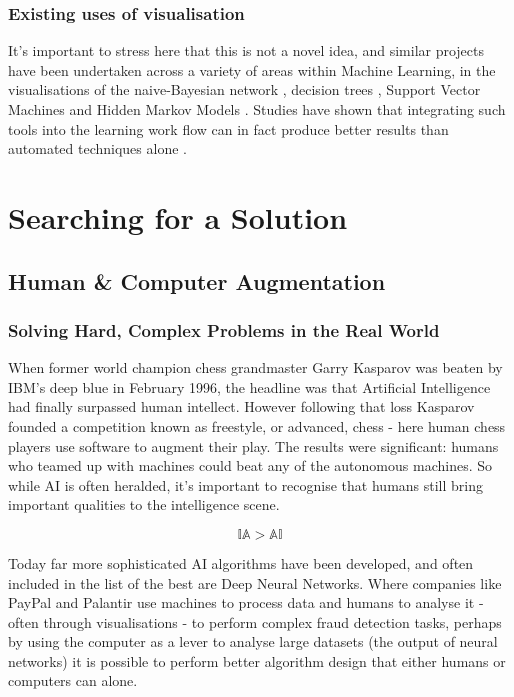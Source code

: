 \documentclass[a4paper,11pt,titlepage]{article}
\begin{document}
\subsubsection{Existing uses of visualisation}
	It's important to stress here that this is not a novel idea, and similar projects have been undertaken across a variety of areas within Machine Learning, in the visualisations of the naive-Bayesian network \cite{Becker2001}, decision trees \cite{Ankerst1999}, Support Vector Machines \cite{Caragea2001} and Hidden Markov Models \cite{Dai2008}. Studies have shown that integrating such tools into the learning work flow can in fact produce better results than automated techniques alone \cite{Ware2002}.

\clearpage 

\section{Searching for a Solution}
	\subsection{Human \& Computer Augmentation}

\subsubsection{Solving Hard, Complex Problems in the Real World}

	When former world champion chess grandmaster Garry Kasparov was beaten by IBM’s deep blue in February 1996, the headline was that Artificial Intelligence had finally surpassed human intellect. However following that loss Kasparov founded a competition known as freestyle, or advanced, chess - here human chess players use software to augment their play. The results were significant: humans who teamed up with machines could beat any of the autonomous machines. So while AI is often heralded, it's important to recognise that humans still bring important qualities to the intelligence scene. 
	
		$$
			\mathbb{IA} > \mathbb{AI}
		$$
	
Today far more sophisticated AI algorithms have been developed, and often included in the list of the best are Deep Neural Networks. Where companies like PayPal and Palantir use machines to process data and humans to analyse it - often through visualisations - to perform complex fraud detection tasks, perhaps by using the computer as a lever to analyse large datasets (the output of neural networks) it is possible to perform better algorithm design that either humans or computers can alone.
\end{document}
